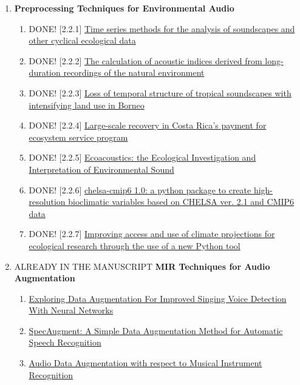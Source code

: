 \begin{enumerate}
\begin{enumerate}
        \item  [2.2] \textbf{Preprocessing Techniques for Environmental Audio}
            \begin{enumerate}
                \item  DONE! [2.2.1] \href{https://doi.org/10.1111/2041-210X.14361}{Time series methods for the analysis of soundscapes and other cyclical ecological data}
                \item  DONE! [2.2.2] \href{https://eprints.qut.edu.au/110634/}{The calculation of acoustic indices derived from long-duration recordings of the natural environment}
                \item  DONE! [2.2.3] \href{https://doi.org/10.1016/j.scitotenv.2022.158268}{Loss of temporal structure of tropical soundscapes with intensifying land use in Borneo}
                \item  DONE! [2.2.4] \href{https://doi.org/10.1101/2024.09.03.610944}{Large-scale recovery in Costa Rica’s payment for ecosystem service program}
                \item  DONE! [2.2.5] \href{https://doi.org/10.1007/s12304-015-9248-x}{Ecoacoustics: the Ecological Investigation and Interpretation of Environmental Sound}
                \item DONE! [2.2.6] \href{https://doi.org/10.1111/ecog.06535}{chelsa-cmip6 1.0: a python package to create high-resolution bioclimatic variables based on CHELSA ver. 2.1 and CMIP6 data}
                \item  DONE! [2.2.7] \href{https://doi.org/10.1111/ecog.07186}{Improving access and use of climate projections for ecological research through the use of a new Python tool}
            \end{enumerate}

        \item [2.4] ALREADY IN THE MANUSCRIPT \textbf{MIR Techniques for Audio Augmentation}
            \begin{enumerate}
                \item [2.4.1] \href{https://www.researchgate.net/publication/314260246_Exploring_Data_Augmentation_for_Improved_Singing_Voice_Detection_with_Neural_Networks}{Exploring Data Augmentation For Improved Singing Voice Detection With Neural Networks}
                \item [2.4.2] \href{https://doi.org/10.48550/arXiv.1904.08779}{SpecAugment: A Simple Data Augmentation Method for Automatic Speech Recognition}
                \item [2.4.3] \href{http://dx.doi.org/10.5281/zenodo.1066137}{Audio Data Augmentation with respect to Musical Instrument Recognition}
            \end{enumerate}
            

\end{enumerate}
\end{enumerate}
